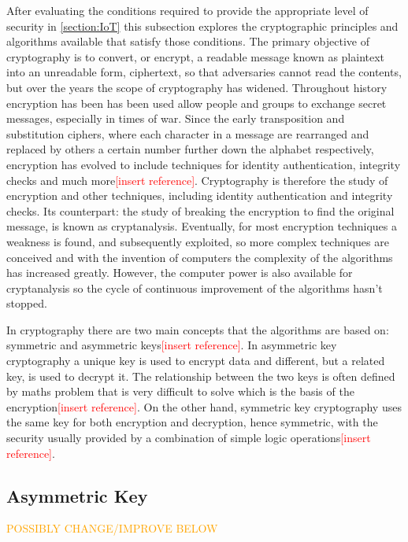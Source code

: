 \documentclass[12pt,twoside,a4paper]{report}
\begin{document}
    After evaluating the conditions required to provide the appropriate level of security  in \autoref{section:IoT} this subsection explores the cryptographic principles and algorithms available that satisfy those conditions. The primary objective of cryptography is to convert, or encrypt, a readable message known as plaintext into an unreadable form, ciphertext, so that adversaries cannot read the contents, but over the years the scope of cryptography has widened. Throughout history encryption has been has been used allow people and groups to exchange secret messages, especially in times of war. Since the early transposition and substitution ciphers, where each character in a message are rearranged and replaced by others a certain number further down the alphabet respectively, encryption has evolved to include techniques for identity authentication, integrity checks and much more\textcolor{red}{[insert reference]}. Cryptography is therefore the study of encryption and other techniques, including identity authentication and integrity checks. Its counterpart: the study of breaking the encryption to find the original message, is known as cryptanalysis\cite{AlfredJ.Menezes1996}. Eventually, for most encryption techniques a weakness is found, and subsequently exploited, so more complex techniques are conceived and with the invention of computers the complexity of the algorithms has increased greatly. However, the computer power is also available for cryptanalysis so the cycle of continuous improvement of the algorithms hasn't stopped.
    
    In cryptography there are two main concepts that the algorithms are based on: symmetric and asymmetric keys\textcolor{red}{[insert reference]}. In asymmetric key cryptography a unique key is used to encrypt data and different, but a related key, is used to decrypt it. The relationship between the two keys is often defined by maths problem that is very difficult to solve which is the basis of the encryption\textcolor{red}{[insert reference]}. On the other hand, symmetric key cryptography uses the same key for both encryption and decryption, hence symmetric, with the security usually provided by a combination of simple logic operations\textcolor{red}{[insert reference]}.
    
    \subsection{Asymmetric Key}
    \textcolor{orange}{POSSIBLY CHANGE/IMPROVE BELOW}
    
\end{document}
